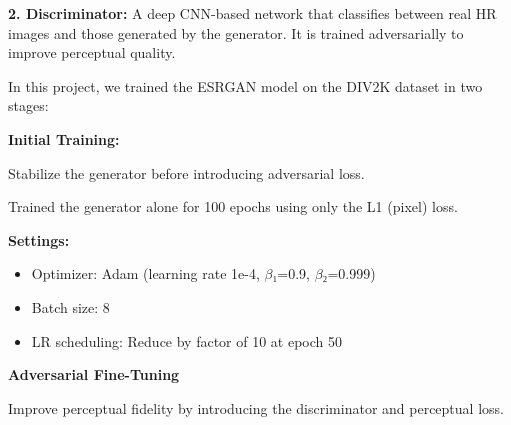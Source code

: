 \textbf{2. Discriminator:} A deep CNN-based network that classifies between real HR images and those generated by the generator. It is trained adversarially to improve perceptual quality.

\vspace{0.7cm}
    
    
        
        
        

In this project, we trained the ESRGAN model on the DIV2K dataset in two stages:

\textbf{Initial Training:}

Stabilize the generator before introducing adversarial loss.

Trained the generator alone for 100 epochs using only the L1 (pixel) loss.

\textbf{Settings:}

\begin{itemize}
    \item Optimizer: Adam (learning rate 1e-4, $\beta$₁=0.9, $\beta$₂=0.999)
    \item Batch size: 8
    \item LR scheduling: Reduce by factor of 10 at epoch 50
\end{itemize}

\textbf{Adversarial Fine-Tuning}

Improve perceptual fidelity by introducing the discriminator and perceptual loss.

